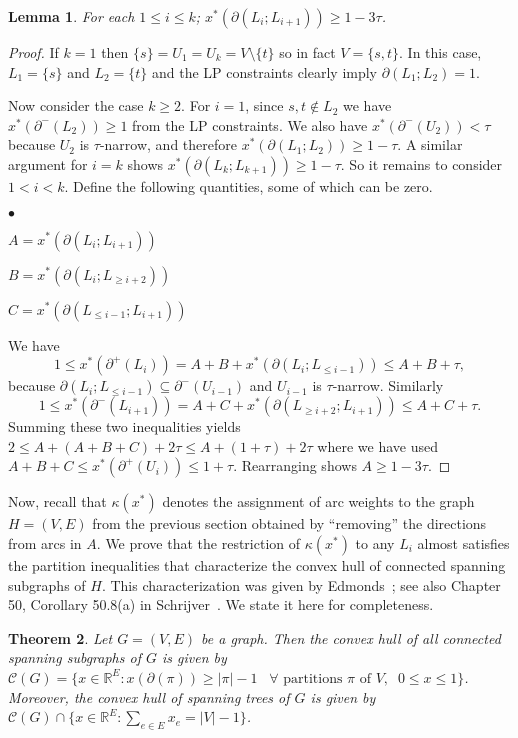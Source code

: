 \documentclass[11pt]{article}
\newtheorem{theorem}{Theorem}[section]
\newtheorem{lemma}[theorem]{Lemma}
\theoremstyle{definition}
\def\Re{{\mathbb R}}
\newcounter{note}[section]
\newcommand{\initOneLiners}{\setlength{\itemsep}{0pt}
    \setlength{\parsep }{0pt}
    \setlength{\topsep }{0pt}
}
\newenvironment{OneLiners}[1][\ensuremath{\bullet}]
    {\begin{list}
        {#1}
        {\initOneLiners}}
    {\end{list}}
\begin{document}
\begin{lemma} \label{lem:li+}
  For each $1 \leq i \leq k$; $x^*(\partial(L_i; L_{i+1})) \geq
  1-3\tau$. \end{lemma}
\begin{proof}
  If $k = 1$ then $\{s\} = U_1 = U_k = V \setminus \{t\}$ so in fact $V = \{s,t\}$. In this case, $L_1 = \{s\}$
  and $L_2 = \{t\}$ and the LP constraints clearly imply $\partial(L_1;L_2) = 1$.

  Now consider the case $k \geq 2$.
  For $i=1$, since $s,t \not\in L_2$ we have $x^*(\partial^-(L_2)) \geq 1$ from the LP
  constraints. We also have $x^*(\partial^-(U_2)) < \tau$ because $U_2$ is
  $\tau$-narrow, and therefore $x^*(\partial(L_1; L_2))\geq 1-\tau$. A similar argument for $i = k$ shows
  $x^*(\partial(L_k; L_{k+1})) \geq 1-\tau$. So it remains to consider
  $1 < i < k$.
Define the following quantities, some of which can be zero.
  \begin{OneLiners}
  \item $A = x^*(\partial(L_i; L_{i+1}))$
  \item $B = x^*(\partial(L_i; L_{\geq i+2}))$
  \item $C = x^*(\partial(L_{\leq i-1}; L_{i+1}))$
  \end{OneLiners}
  We have
  \[ 1 \leq x^*(\partial^+(L_i)) = A+B+x^*(\partial(L_i; L_{\leq i-1})) \leq
  A+B + \tau,
  \] because $\partial(L_i; L_{\leq i-1}) \subseteq
  \partial^-(U_{i-1})$ and $U_{i-1}$ is $\tau$-narrow.  Similarly
  \[ 1 \leq x^*(\partial^-(L_{i+1})) = A+C+x^*(\partial(L_{\geq i+2};
  L_{i+1})) \leq A+C + \tau.
  \]
  Summing these two inequalities yields $2 \leq A + (A + B + C) + 2\tau
  \leq A + (1+\tau) + 2\tau$ where we have used $A+B+C \leq
  x^*(\partial^+(U_i)) \leq 1 + \tau$. Rearranging shows $A \geq 1-3\tau$.
\end{proof}






Now, recall that $\kappa(x^*)$ denotes the assignment of arc weights to
the graph $H = (V,E)$ from the previous section obtained by ``removing''
the directions from arcs in $A$.  We prove that the restriction of
$\kappa(x^*)$ to any $L_i$ almost satisfies the partition inequalities
that characterize the convex hull of connected spanning subgraphs of $H$. This characterization was given by Edmonds~\cite{Edmonds70b}; see also Chapter 50, Corollary 50.8(a) in Schrijver~\cite{Schrijver-book}. We state it here for completeness.


\begin{theorem}\cite{Edmonds70b}
Let $G=(V,E)$ be a graph. Then the convex hull of all connected spanning subgraphs of $G$ is given by ${\mathcal C}(G)=\{x\in \Re^E: x(\partial(\pi))\geq |\pi|-1 \;\;\; \forall \textrm{ partitions } \pi \textrm{ of  } V, \;\; 0\leq x\leq 1\}$. Moreover, the convex hull of spanning trees of $G$ is given by
${\mathcal C}(G)\cap \{x \in \Re^E : \sum_{e\in E} x_e= |V|-1\}$.
\end{theorem}
\end{document}
